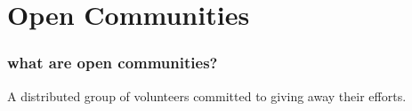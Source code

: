 \section{Open Communities}

\begin{frame} 
\frametitle{what are open communities?}

\huge
\begin{center}
\begin{minipage}{7cm}
A distributed group of \alert{volunteers} committed to \alert{giving away} their efforts.
\end{minipage}
\end{center}

\end{frame} 

